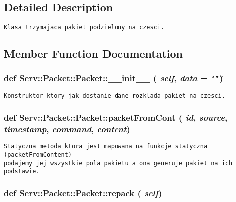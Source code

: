 \subsection{Detailed Description}


\footnotesize\begin{verbatim}Klasa trzymajaca pakiet podzielony na czesci.\end{verbatim}
\normalsize
 

\subsection{Member Function Documentation}
\hypertarget{class_serv_1_1_packet_1_1_packet_1f71ef65b348c86a047c87abe9ca2775}{
\subsubsection[{\_\-\_\-init\_\-\_\-}]{\setlength{\rightskip}{0pt plus 5cm}def Serv::Packet::Packet::\_\-\_\-init\_\-\_\- ( {\em self}, \/   {\em data} = {\tt \char`\"{}\char`\"{}})}}
\label{class_serv_1_1_packet_1_1_packet_1f71ef65b348c86a047c87abe9ca2775}




\footnotesize\begin{verbatim}Konstruktor ktory jak dostanie dane rozklada pakiet na czesci.\end{verbatim}
\normalsize
 \hypertarget{class_serv_1_1_packet_1_1_packet_393243697bc1e23d5adadc50698fccd1}{
\subsubsection[{packetFromCont}]{\setlength{\rightskip}{0pt plus 5cm}def Serv::Packet::Packet::packetFromCont ( {\em id}, \/   {\em source}, \/   {\em timestamp}, \/   {\em command}, \/   {\em content})}}
\label{class_serv_1_1_packet_1_1_packet_393243697bc1e23d5adadc50698fccd1}




\footnotesize\begin{verbatim}Statyczna metoda ktora jest mapowana na funkcje statyczna (packetFromContent)
podajemy jej wszystkie pola pakietu a ona generuje pakiet na ich podstawie.
\end{verbatim}
\normalsize
 \hypertarget{class_serv_1_1_packet_1_1_packet_6dab330b602405f42b3fe090863e5c1e}{
\subsubsection[{repack}]{\setlength{\rightskip}{0pt plus 5cm}def Serv::Packet::Packet::repack ( {\em self})}}
\label{class_serv_1_1_packet_1_1_packet_6dab330b602405f42b3fe090863e5c1e}




